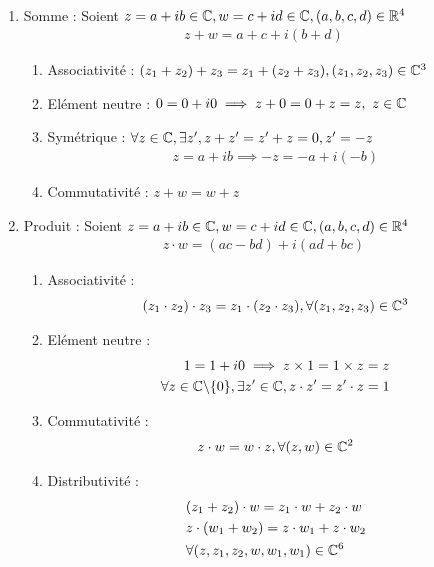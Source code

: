     \begin{proposition}~
\begin{enumerate}
\item Somme : Soient $z = a + ib \in \mathbb{C}, w = c + id \in \mathbb{C}, (a, b, c, d) \in \mathbb{R}^4$
\begin{align*}
    z + w = a + c + i (b + d)
\end{align*}

\begin{enumerate}
    \item Associativité : $(z_1 + z_2) + z_3 = z_1 + (z_2 + z_3), (z_1, z_2, z_3) \in \mathbb{C}^3$
    \item Elément neutre : $0 = 0 + i0 \implies z + 0 = 0 + z = z,\ z \in \mathbb{C}$
\item Symétrique : $\forall z \in \mathbb{C}, \exists z', z + z' = z' + z = 0, z' = -z$
\begin{align*}
    z = a + ib \implies -z = -a + i(-b)
\end{align*}
\item Commutativité : $z + w = w + z$
\end{enumerate}

\item Produit : Soient $z = a + ib \in \mathbb{C}, w = c + id \in \mathbb{C}, (a, b, c, d) \in \mathbb{R}^4$
\begin{align*}
    z \cdot w = (ac - bd) + i(ad + bc)
\end{align*}

\begin{enumerate}
    \item Associativité :
    \begin{align*}
        (z_1 \cdot z_2) \cdot z_3 = z_1 \cdot (z_2 \cdot z_3), \forall (z_1, z_2, z_3) \in \mathbb{C}^3 
    \end{align*}
    \item Elément neutre :
        \begin{align*}
            1 = 1 + i0 \implies z \times 1 = 1 \times z = z \\
            \forall z \in \mathbb{C} \backslash \{0\}, \exists z' \in \mathbb{C}, z \cdot z' = z' \cdot z =1 
        \end{align*}
    \item Commutativité :
        \begin{align*}
            z \cdot w = w \cdot z, \forall (z, w) \in \mathbb{C}^2 
        \end{align*}
    \item Distributivité :
        \begin{align*}
        &(z_1 + z_2) \cdot w = z_1 \cdot w + z_2 \cdot w \\
        &z \cdot (w_1 + w_2) = z \cdot w_1 + z \cdot w_2 \\
        &\forall (z, z_1, z_2, w, w_1, w_1) \in \mathbb{C}^6
        \end{align*}
\end{enumerate}

\end{enumerate}
\end{proposition}

